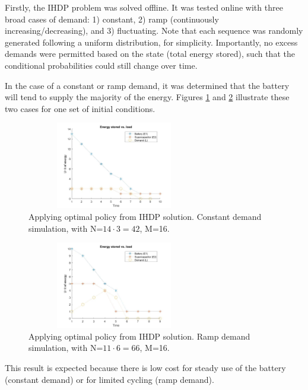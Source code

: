 \documentclass[conference]{IEEEtran}
\begin{document}
Firstly, the IHDP problem was solved offline. It was tested online with three broad cases of demand: 1) constant, 2) ramp (continuously increasing/decreasing), and 3) fluctuating. Note that each sequence was randomly generated following a uniform distribution, for simplicity. Importantly, no excess demands were permitted based on the state (total energy stored), such that the conditional probabilities could still change over time.

In the case of a constant or ramp demand, it was determined that the battery will tend to supply the majority of the energy. Figures \ref{fig:ConstDemand} and \ref{fig:RampDemand} illustrate these two cases for one set of initial conditions.
\begin{figure}[htbp]
\centerline{\includegraphics[width=3in,height=1.5in]{EnergyStoredvsload_ConstantLoad(E1_max=13,E2_max=2).jpg}}
\caption{Applying optimal policy from IHDP solution. Constant demand simulation, with N=$14\cdot3=42$, M=16.}
\label{fig:ConstDemand}
\end{figure}
\begin{figure}[htbp]
\centerline{\includegraphics[width=3in,height=1.5in]{EnergyStoredvsload_RampLoad(E1_max=10,E2_max=5).jpg}}
\caption{Applying optimal policy from IHDP solution. Ramp demand simulation, with N=$11\cdot6=66$, M=16.}
\label{fig:RampDemand}
\end{figure} This result is expected because there is low cost for steady use of the battery (constant demand) or for limited cycling (ramp demand).
\end{document}
